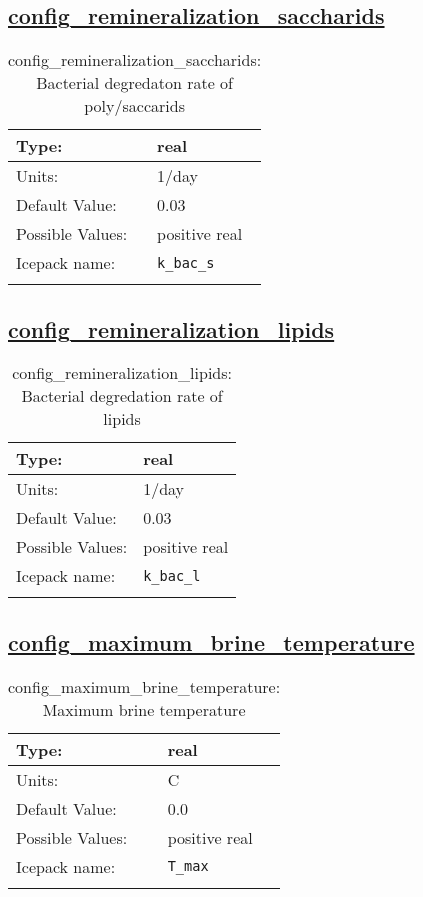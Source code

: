 \subsection[config\_remineralization\_saccharids]{\hyperref[sec:nm_tab_biogeochemistry]{config\_remineralization\_saccharids}}
\label{subsec:nm_sec_config_remineralization_saccharids}
\begin{center}
\begin{longtable}{| p{2.0in} || p{4.0in} |}
    \hline
    Type: & real \\
    \hline
    Units: & \si{1/day} \\
    \hline
    Default Value: & 0.03 \\
    \hline
    Possible Values: & positive real \\
    \hline
    \hline
    Icepack name: & \verb+k_bac_s+ \\
    \caption{config\_remineralization\_saccharids: Bacterial degredaton rate of poly/saccarids}
\end{longtable}
\end{center}
\subsection[config\_remineralization\_lipids]{\hyperref[sec:nm_tab_biogeochemistry]{config\_remineralization\_lipids}}
\label{subsec:nm_sec_config_remineralization_lipids}
\begin{center}
\begin{longtable}{| p{2.0in} || p{4.0in} |}
    \hline
    Type: & real \\
    \hline
    Units: & \si{1/day} \\
    \hline
    Default Value: & 0.03 \\
    \hline
    Possible Values: & positive real \\
    \hline
    \hline
    Icepack name: & \verb+k_bac_l+ \\
    \caption{config\_remineralization\_lipids: Bacterial degredation rate of lipids}
\end{longtable}
\end{center}
\subsection[config\_maximum\_brine\_temperature]{\hyperref[sec:nm_tab_biogeochemistry]{config\_maximum\_brine\_temperature}}
\label{subsec:nm_sec_config_maximum_brine_temperature}
\begin{center}
\begin{longtable}{| p{2.0in} || p{4.0in} |}
    \hline
    Type: & real \\
    \hline
    Units: & \si{C} \\
    \hline
    Default Value: & 0.0 \\
    \hline
    Possible Values: & positive real \\
    \hline
    \hline
    Icepack name: & \verb+T_max+ \\
    \caption{config\_maximum\_brine\_temperature: Maximum brine temperature}
\end{longtable}
\end{center}
